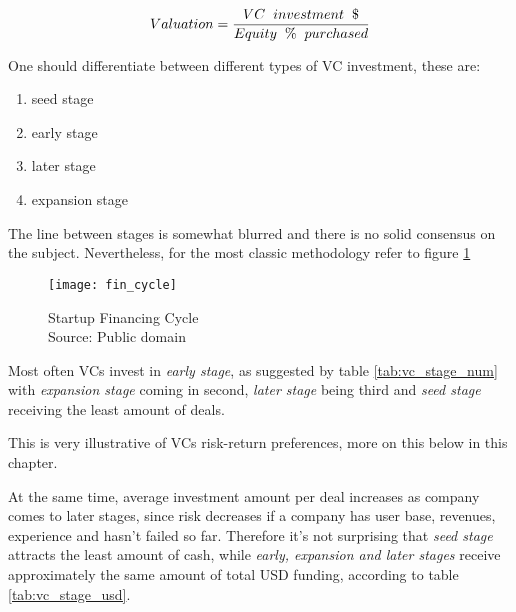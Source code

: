 \begin{equation}
\label{eq:valuation}
    Valuation = \frac{VC \hspace{0.2cm} investment \hspace{0.2cm} \$}{Equity \hspace{0.2cm} \% \hspace{0.2cm} purchased}
\end{equation}

One should differentiate between different types of VC investment, these are:
\begin{enumerate}
    \item seed stage
    \item early stage
    \item later stage
    \item expansion stage
\end{enumerate}

The line between stages is somewhat blurred and there is no solid consensus on the subject. Nevertheless, for the most classic methodology refer to  figure \ref{fig:fin_cycle}

\begin{figure}[ht]
    \centering
    \texttt{[image: fin\_cycle]}
    \caption{Startup Financing Cycle\\Source: Public domain}
    \label{fig:fin_cycle}
\end{figure}

Most often VCs invest in \emph{early stage}, as suggested by table \ref{tab:vc_stage_num} with \emph{expansion stage} coming in second, \emph{later stage} being third and \emph{seed stage} receiving the least amount of deals.

This is very illustrative of VCs risk-return preferences, more on this below in this chapter.

At the same time, average investment amount per deal increases as company comes to later stages, since risk decreases if a company has user base, revenues, experience and hasn't failed so far. Therefore it's not surprising that \emph{seed stage} attracts the least amount of cash, while \emph{early, expansion and later stages} receive approximately the same amount of total USD funding, according to table \ref{tab:vc_stage_usd}.


